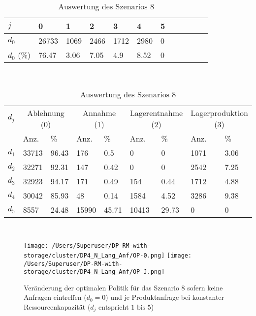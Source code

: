 \begin{table}[h!]
\renewcommand{\arraystretch}{1.5}
  \begin{center}
    \caption{Auswertung des Szenarios 8}  \label{AS8}
    \vspace*{3mm}
    \begin{tabular}{l l l l l l l l l l l l }  \hline 
         $j$ & 0 & 1  & 2 & 3 & 4  & 5   \\  \hline
$d_{0}$ &  26733 &  1069 &  2466 &  1712 &  2980 &  0 \\
$d_{0}$ (\%) &  76.47 &  3.06 &  7.05 &   4.9 &  8.52 &  0 \\
\hline
    \end{tabular} \\[3mm]
        \begin{tabular}{ l l l l l l l l l}   \hline    %
    $d_j$ & \multicolumn{2}{c}{Ablehnung (0)} & \multicolumn{2}{c}{Annahme (1)}  & \multicolumn{2}{c}{Lagerentnahme (2)} & \multicolumn{2}{c}{Lagerproduktion (3)}\\
    & Anz. & \% & Anz. & \% & Anz. & \% & Anz. & \% \\ \hline 
$d_{1}$ &  33713 &  96.43 &    176 &    0.5 &    0 &    0 &  1071 &  3.06 \\
$d_{2}$ &  32271 &  92.31 &    147 &   0.42 &    0 &    0 &  2542 &  7.25 \\
$d_{3}$ &  32923 &  94.17 &    171 &   0.49 &    154 &   0.44 &  1712 &  4.88 \\
$d_{4}$ &  30042 &  85.93 &     48 &   0.14 &   1584 &   4.52 &  3286 &  9.38 \\
$d_{5}$ &   8557 &  24.48 &  15990 &  45.71 &  10413 &  29.73 &   0 &   0 \\
          \hline
   \end{tabular} \\[3mm]
     \end{center}
\end{table}

\begin{figure}[h!]     
\begin{center}
\texttt{[image: /Users/Superuser/DP-RM-with-storage/cluster/DP4\_N\_Lang\_Anf/OP-0.png]}
\texttt{[image: /Users/Superuser/DP-RM-with-storage/cluster/DP4\_N\_Lang\_Anf/OP-J.png]}
    \caption{Veränderung der optimalen Politik für das Szenario 8 sofern keine Anfragen eintreffen ($d_0=0$) und je Produktanfrage bei konstanter Ressourcenkapazität ($d_j\text{ entspricht }1\text{ bis }5$)}  \label{SV8}
  \end{center}
\end{figure}

